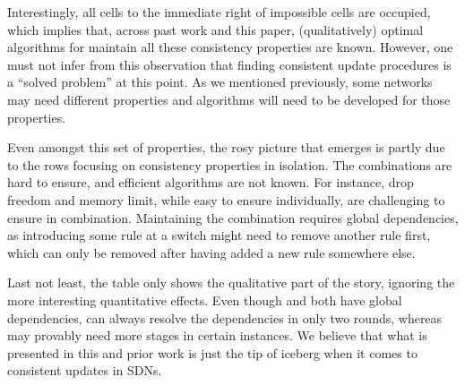 Interestingly, all cells to the immediate right of impossible cells are occupied, which implies that, across past work and this paper,  (qualitatively) optimal algorithms for maintain all these consistency properties are known. However, one must not infer from this observation that finding consistent update procedures is a ``solved problem'' at this point.  As we mentioned previously, some networks may need different properties and algorithms will need to be developed for those properties.

Even amongst this set of properties, the rosy picture that emerges is partly due to the rows focusing on consistency properties in isolation. The combinations are hard to  ensure, and efficient algorithms are not known. For instance, drop freedom and memory limit, while easy to ensure individually, are challenging to ensure in combination. Maintaining the combination requires global dependencies, as introducing some rule at a switch might need to remove another rule first, which can only be removed after having added a new rule somewhere else. 

Last not least, the table only shows the qualitative part of the story, ignoring the more interesting quantitative effects. Even though \cite{safeupdate} and \cite{swan} both have global dependencies, \cite{safeupdate} can always resolve the dependencies in only two rounds, whereas \cite{swan} may provably need more stages in certain instances. We believe that what is presented in this and prior work is just the tip of iceberg when it comes to consistent updates in SDNs.
